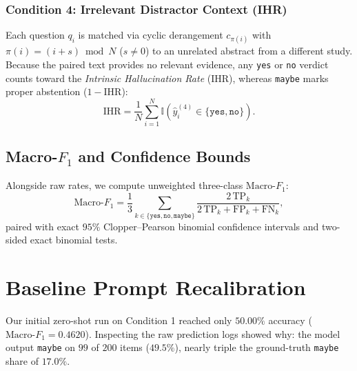 \documentclass[10pt,twocolumn,letterpaper]{article}
\begin{document}
\subsubsection{Condition 4: Irrelevant Distractor Context (IHR)}
Each question $q_i$ is matched via cyclic derangement $c_{\pi(i)}$ with $\pi(i) = (i + s) \bmod N$ ($s \neq 0$) to an unrelated abstract from a different study. Because the paired text provides no relevant evidence, any \texttt{yes} or \texttt{no} verdict counts toward the \textit{Intrinsic Hallucination Rate} (IHR), whereas \texttt{maybe} marks proper abstention ($1 - \text{IHR}$):
\begin{equation}
\text{IHR} = \frac{1}{N}\sum_{i=1}^{N} \mathbb{I}\left(\hat{y}_i^{(4)} \in \{\texttt{yes}, \texttt{no}\}\right).
\end{equation}

\subsection{\texorpdfstring{Macro-$F_1$}{Macro-F1} and Confidence Bounds}
Alongside raw rates, we compute unweighted three-class $\text{Macro-}F_1$:
\begin{equation}
\text{Macro-}F_1 = \frac{1}{3}\sum_{k \in \{\texttt{yes},\texttt{no},\texttt{maybe}\}} \frac{2\,\text{TP}_k}{2\,\text{TP}_k + \text{FP}_k + \text{FN}_k},
\end{equation}
paired with exact $95\%$ Clopper–Pearson binomial confidence intervals and two-sided exact binomial tests.

\section{Baseline Prompt Recalibration}
Our initial zero-shot run on Condition 1 reached only $50.00\%$ accuracy ($\text{Macro-}F_1 = 0.4620$). Inspecting the raw prediction logs showed why: the model output \texttt{maybe} on $99$ of $200$ items ($49.5\%$), nearly triple the ground-truth \texttt{maybe} share of $17.0\%$.
\end{document}
